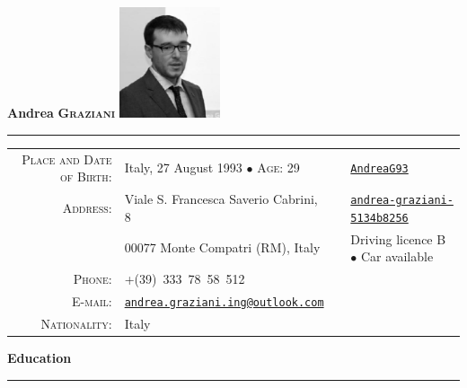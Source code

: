 \documentclass[english,10pt,a4paper]{article}
\newcommand{\CvBullet}{\hspace{0.05cm} $\bullet$ \hspace{0.05cm}}
\newcommand{\CvSection}[2]{\vspace{0.5cm}
	{\LARGE \textcolor{CvColor}{#1 \hspace{2pt} \textbf{#2}}} \\
	\textcolor{CvColor}{\rule[.5\baselineskip]{0.5\textwidth}{0.5pt}}}
\begin{document}
	
	{\Huge \textcolor{CvColor!50}{\textbf{Andrea}} \textcolor{CvColor!80}{\scshape \textbf{Graziani}}} \hfill
	\includegraphics[width=8em]{./Images/Photo.png} \\
	\textcolor{CvColor}{\rule[.5\baselineskip]{\textwidth}{1pt}}
	
	
	\begin{tabular}{rlrl}
		\textsc{Place and Date of Birth:} & Italy, 27 August 1993 \CvBullet \hspace{0.05cm} \textsc{Age}: 29 & \textsc{\faGithub} & \href{https://github.com/AndreaG93}{\texttt{AndreaG93}} \\
		
		\textsc{Address:} & Viale S. Francesca Saverio Cabrini, 8 & \textsc{\faLinkedin} & \href{https://it.linkedin.com/in/andrea-graziani-5134b8256}{\texttt{andrea-graziani-5134b8256}} \\
		
		& 00077 Monte Compatri (RM), Italy & \faCar & Driving licence B \CvBullet Car available \\
		
		\textsc{Phone:} & +(39)~333~78~58~512 && \\
		\textsc{E-mail:} & \href{mailto:andrea.graziani.ing@outlook.com}{\texttt{andrea.graziani.ing@outlook.com}} && \\
		\textsc{Nationality}: & Italy
	\end{tabular}
	
	\CvSection{\faGraduationCap}{Education}
	
\end{document}
